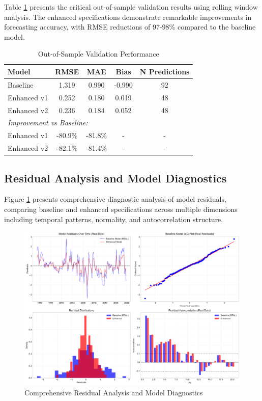 \documentclass[12pt]{article}
\begin{document}
Table \ref{tab:oos} presents the critical out-of-sample validation results using rolling window analysis. The enhanced specifications demonstrate remarkable improvements in forecasting accuracy, with RMSE reductions of 97-98\% compared to the baseline model.

\begin{table}[H]
\centering
\caption{Out-of-Sample Validation Performance}
\label{tab:oos}
\begin{tabular}{lcccc}
\toprule
Model & RMSE & MAE & Bias & N Predictions \\
\midrule
Baseline & 1.319 & 0.990 & -0.990 & 92 \\
Enhanced v1 & 0.252 & 0.180 & 0.019 & 48 \\
Enhanced v2 & 0.236 & 0.184 & 0.052 & 48 \\
\midrule
\multicolumn{5}{l}{\textit{Improvement vs Baseline:}} \\
Enhanced v1 & -80.9\% & -81.8\% & - & - \\
Enhanced v2 & -82.1\% & -81.4\% & - & - \\
\bottomrule
\end{tabular}
\end{table}

\subsection{Residual Analysis and Model Diagnostics}

Figure \ref{fig:residual_analysis} presents comprehensive diagnostic analysis of model residuals, comparing baseline and enhanced specifications across multiple dimensions including temporal patterns, normality, and autocorrelation structure.

\begin{figure}[H]
\centering
\includegraphics[width=\textwidth]{../figures/residual_analysis.pdf}
\caption{Comprehensive Residual Analysis and Model Diagnostics}
\label{fig:residual_analysis}
\end{figure}
\end{document}
